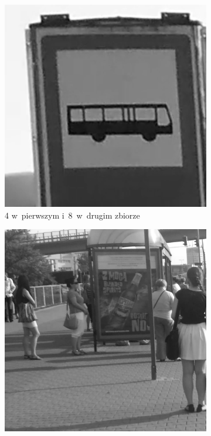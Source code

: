\begin{figure}[h!]\centering
	\begin{subfigure}{.24\linewidth}\centering
		\centering
		\includegraphics[width=1\textwidth]{img/5sessions/01-wrong-01}
		\caption{4 w~pierwszym i~8~w~drugim zbiorze}
	\end{subfigure}
	\hfill	
	\begin{subfigure}{.24\linewidth}\centering
		\centering
		\includegraphics[width=1\textwidth]{img/5sessions/02-wrong-05}

\end{subfigure}
\end{figure}
